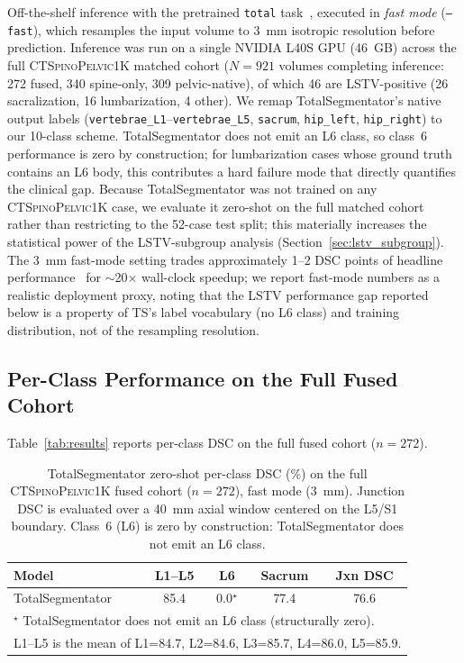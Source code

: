 \documentclass[pmlr]{jmlr}
\newcommand{\dataset}{\textsc{CTSpinoPelvic1K}}
\begin{document}
Off-the-shelf inference with the pretrained \texttt{total}
task~\citep{Wasserthal2023TotalSegmentator:Images}, executed in
\emph{fast mode} (\texttt{--fast}), which resamples the input
volume to 3~mm isotropic resolution before prediction.
Inference was run on a single NVIDIA L40S GPU (46~GB) across the
full \dataset{} matched cohort ($N=921$ volumes completing
inference: 272 fused, 340 spine-only, 309 pelvic-native), of which
46 are LSTV-positive (26 sacralization, 16 lumbarization, 4 other).
We remap TotalSegmentator's native output labels
(\texttt{vertebrae\_L1}--\texttt{vertebrae\_L5}, \texttt{sacrum},
\texttt{hip\_left}, \texttt{hip\_right}) to our 10-class scheme.
TotalSegmentator does not emit an L6 class, so class~6 performance
is zero by construction; for lumbarization cases whose ground
truth contains an L6 body, this contributes a hard failure mode
that directly quantifies the clinical gap.
Because TotalSegmentator was not trained on any \dataset{} case,
we evaluate it zero-shot on the full matched cohort rather than
restricting to the 52-case test split; this materially increases
the statistical power of the LSTV-subgroup analysis
(Section~\ref{sec:lstv_subgroup}).
The 3~mm fast-mode setting trades approximately 1--2 DSC points of
headline performance~\citep{Wasserthal2023TotalSegmentator:Images} for
$\sim$20$\times$ wall-clock speedup; we report fast-mode numbers as
a realistic deployment proxy, noting that the LSTV performance
gap reported below is a property of TS's label vocabulary
(no L6 class) and training distribution, not of the resampling
resolution.

\subsection{Per-Class Performance on the Full Fused Cohort}

Table~\ref{tab:results} reports per-class DSC on the full fused
cohort ($n=272$).

\begin{table}[t]
  {\caption{TotalSegmentator zero-shot per-class DSC (\%) on the
    full \dataset{} fused cohort ($n=272$), fast mode (3~mm).
    Junction DSC is evaluated over a 40~mm axial window centered
    on the L5/S1 boundary. Class~6 (L6) is zero by construction:
    TotalSegmentator does not emit an L6 class.}}
  {\small\begin{tabular}{lcccc}
  \toprule
  \bfseries Model & \bfseries L1--L5 & \bfseries L6
    & \bfseries Sacrum & \bfseries Jxn DSC \\
  \midrule
  TotalSegmentator & 85.4 & \phantom{0}0.0$^\star$ & 77.4 & 76.6 \\
  \midrule
  \multicolumn{5}{l}{\footnotesize
    $^\star$ TotalSegmentator does not emit an L6 class
    (structurally zero).}\\
  \multicolumn{5}{l}{\footnotesize
    L1--L5 is the mean of L1=84.7, L2=84.6, L3=85.7, L4=86.0,
    L5=85.9.}\\
  \bottomrule
  \end{tabular}}
\end{table}
\end{document}
